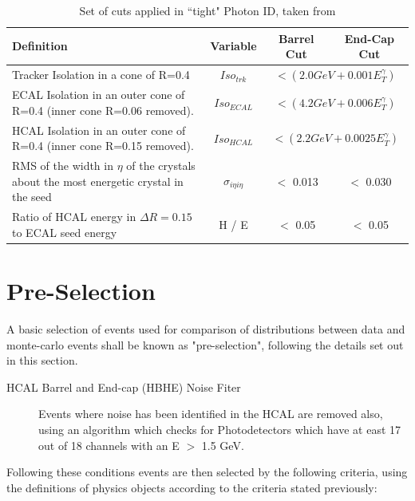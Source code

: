 \begin{table}[htbp]
\centering
\begin{tabular}{ m{6.9cm} c c c}
\hline
\hline
 \centering Definition & Variable & Barrel Cut & End-Cap Cut \\
\hline
\hline
Tracker Isolation in a cone of R=0.4 & $Iso_{trk}$ & \multicolumn{2}{c}{$< (2.0 GeV + 0.001E_{T}^{\gamma})$}\\
ECAL Isolation in an outer cone of R=0.4 (inner cone R=0.06 removed). & $Iso_{ECAL}$ & \multicolumn{2}{c}{$< (4.2 GeV + 0.006E_{T}^{\gamma})$}\\

HCAL Isolation in an outer cone of R=0.4 (inner cone R=0.15 removed). & $Iso_{HCAL}$ & \multicolumn{2}{c}{$< (2.2 GeV + 0.0025E_{T}^{\gamma})$}\\

RMS of the width in $\eta$ of the crystals about the most energetic crystal in the seed& $\sigma_{i \eta i \eta}$ & $<$ 0.013 & $<$ 0.030\\
Ratio of HCAL energy in $\Delta R = 0.15$ to ECAL seed energy & H / E & $<$ 0.05 & $<$ 0.05\\
\hline
\end{tabular}
\caption{\label{tab:pid} Set of cuts applied in ``tight" Photon ID, taken from \cite{EGM-10-006}}
\end{table}

\section{Pre-Selection}
\label{sec:press}
A basic selection of events used for comparison of distributions between data and monte-carlo events shall be known as "pre-selection", following the details set out in this section.

\begin{description}


\item[HCAL Barrel and End-cap (HBHE) Noise Fiter]{Events where noise has been identified in the HCAL are removed also, using an algorithm which checks for Photodetectors which have at east 17 out of 18 channels with an E $>$ 1.5 GeV.}
\end{description}
Following these conditions events are then selected by the following criteria, using the definitions of physics objects according to the criteria stated previously:

